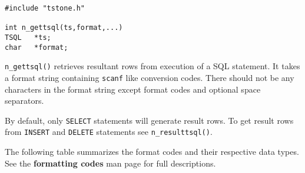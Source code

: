 
\SYNOPSIS
\begin{verbatim}
#include "tstone.h"

int n_gettsql(ts,format,...)
TSQL   *ts;
char   *format;
\end{verbatim}

\DESCRIPTION

\verb`n_gettsql()` retrieves resultant rows from execution of a SQL
statement.  It takes a format string containing \verb`scanf` like
conversion codes.  There should not be any characters in the format
string except format codes and optional space separators.

By default, only \verb`SELECT` statements will generate result rows. To get
result rows from \verb`INSERT` and \verb`DELETE` statements see \verb`n_resulttsql()`.

The following table summarizes the format codes and their respective
data types.  See the {\bf formatting codes} man page for full
descriptions.

